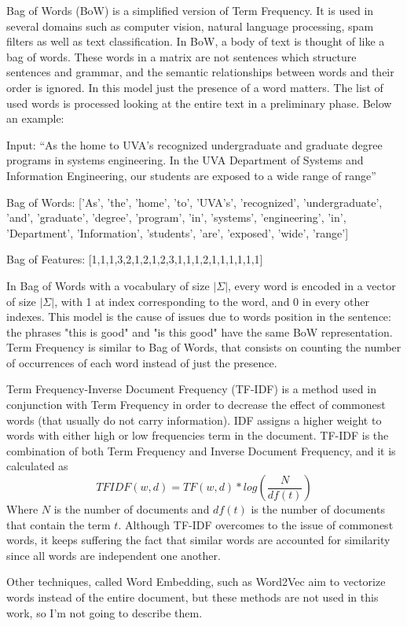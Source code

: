 \begin{description}
	\item Bag of Words (BoW) is a simplified version of Term Frequency. It is used in several domains such as computer vision, natural language processing, spam filters as well as text classification. In BoW, a body of text is thought of like a bag of words. These words in a matrix are not sentences which structure sentences and grammar, and the semantic relationships between words and their order is ignored. In this model just the presence of a word matters. The list of used words is processed looking at the entire text in a preliminary phase. Below an example:
	\begin{description}
		\item Input: “As the home to UVA’s recognized undergraduate and graduate degree programs in systems
		engineering. In the UVA Department of Systems and Information Engineering, our students are
		exposed to a wide range of range”
		\item Bag of Words: ['As', 'the', 'home', 'to', 'UVA’s', 'recognized', 'undergraduate', 'and', 'graduate', 'degree', 'program', 'in', 'systems', 'engineering', 'in', 'Department', 'Information', 'students', 'are', 'exposed', 'wide', 'range']
		\item Bag of Features: [1,1,1,3,2,1,2,1,2,3,1,1,1,2,1,1,1,1,1,1]
	\end{description}
	In Bag of Words with a vocabulary of size $|\Sigma|$, every word is encoded in a vector of size $|\Sigma|$, with 1 at index corresponding to the word, and 0 in every other indexes. This model is the cause of issues due to words position in the sentence: the phrases "this is good" and "is this good" have the same BoW representation. Term Frequency is similar to Bag of Words, that consists on counting the number of occurrences of each word instead of just the presence.
	\item Term Frequency-Inverse Document Frequency (TF-IDF) is a method used in conjunction with Term Frequency in order to decrease the effect of commonest words (that usually do not carry information). IDF assigns a higher weight to words with either high or low frequencies term in the document. TF-IDF is the combination of both Term Frequency and Inverse Document Frequency, and it is calculated as
	\[TFIDF(w,d) = TF(w, d) * log(\frac{N}{df(t)})\]
	Where $N$ is the number of documents and $df(t)$ is the number of documents that contain the term $t$. Although TF-IDF overcomes to the issue of commonest words, it keeps suffering the fact that similar words are accounted for similarity since all words are independent one another. 
	\item Other techniques, called Word Embedding, such as Word2Vec \cite{NIPS2013_5021} aim to vectorize words instead of the entire document, but these methods are not used in this work, so I'm not going to describe them.
\end{description}


